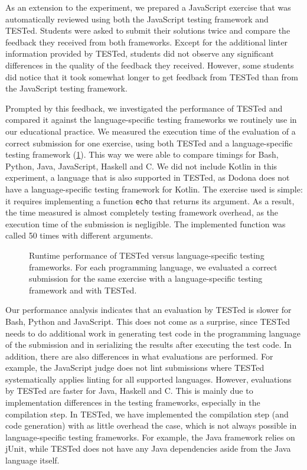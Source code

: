 \documentclass[../main]{subfiles}
\begin{document}
As an extension to the experiment, we prepared a JavaScript exercise that was automatically reviewed using both the JavaScript testing framework and TESTed.
Students were asked to submit their solutions twice and compare the feedback they received from both frameworks.
Except for the additional linter information provided by TESTed, students did not observe any significant differences in the quality of the feedback they received.
However, some students did notice that it took somewhat longer to get feedback from TESTed than from the JavaScript testing framework.

Prompted by this feedback, we investigated the performance of TESTed and compared it against the language-specific testing frameworks we routinely use in our educational practice.
We measured the execution time of the evaluation of a correct submission for one exercise, using both TESTed and a language-specific testing framework (\cref{fig:performance}).
This way we were able to compare timings for Bash, Python, Java, JavaScript, Haskell and C\@.
We did not include Kotlin in this experiment, a language that is also supported in TESTed, as Dodona does not have a language-specific testing framework for Kotlin.
The exercise used is simple: it requires implementing a function \texttt{echo} that returns its argument.
As a result, the time measured is almost completely testing framework overhead, as the execution time of the submission is negligible.
The implemented function was called 50 times with different arguments.

\begin{figure}
    \centering
    
    \caption{Runtime performance of TESTed versus language-specific testing frameworks. For each programming language, we evaluated a correct submission for the same exercise with a language-specific testing framework and with TESTed.}
    \label{fig:performance}
\end{figure}

Our performance analysis indicates that an evaluation by TESTed is slower for Bash, Python and JavaScript.
This does not come as a surprise, since TESTed needs to do additional work in generating test code in the programming language of the submission and in serializing the results after executing the test code.
In addition, there are also differences in what evaluations are performed.
For example, the JavaScript judge does not lint submissions where TESTed systematically applies linting for all supported languages.
However, evaluations by TESTed are faster for Java, Haskell and C\@.
This is mainly due to implementation differences in the testing frameworks, especially in the compilation step.
In TESTed, we have implemented the compilation step (and code generation) with as little overhead the case, which is not always possible in language-specific testing frameworks.
For example, the Java framework relies on jUnit, while TESTed does not have any Java dependencies aside from the Java language itself.
\end{document}

